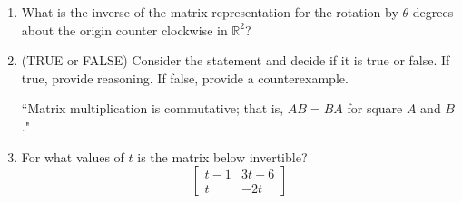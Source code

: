 \documentclass[14pt]{article}
\begin{document}
\begin{enumerate}
\item What is the inverse of the matrix representation for the rotation by $ \theta $ degrees about the origin counter clockwise in $ \mathbb{R}^2 $?

\item (TRUE or FALSE) Consider the statement and decide if it is true or false.  If true, provide reasoning.  If false, provide a counterexample.
\begin{center}
``Matrix multiplication is commutative; that is, $ AB = BA $ for square $ A $ and $ B $."
\end{center}

\item For what values of $ t $ is the matrix below invertible?
\[
\left[\begin{array}{cc}
t-1 & 3t-6 \\ t & -2t
\end{array}\right]
\]




























\end{enumerate}
\end{document}
